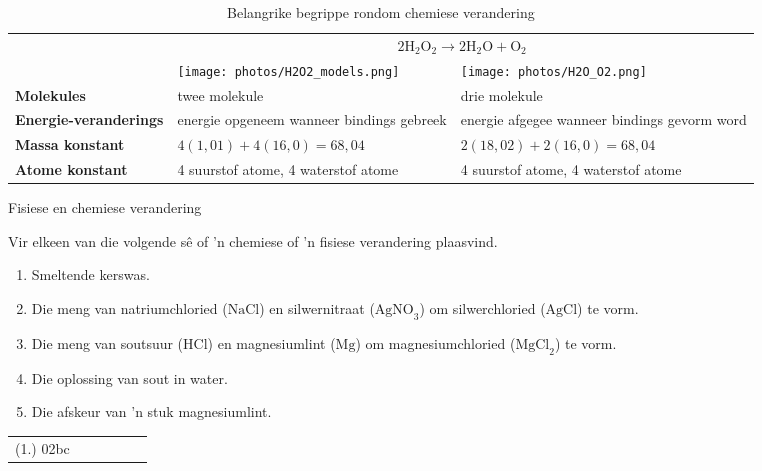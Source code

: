 \begin{table}[H]
 \begin{center}
  \begin{tabular}{|l|p{5cm}|p{5cm}|} \hline
& \multicolumn{2}{|c|}{$2\text{H}_{2}\text{O}_{2} \rightarrow 2\text{H}_{2}\text{O} + \text{O}_{2}$} \\ 
& \texttt{[image: photos/H2O2\_models.png]} & \texttt{[image: photos/H2O\_O2.png]} \\ \hline
   \textbf{Molekules} & twee molekule & drie molekule \\ \hline
\textbf{Energie-veranderings} & energie opgeneem wanneer bindings gebreek & energie afgegee wanneer bindings gevorm word \\ \hline
\textbf{Massa konstant} & $4(1,01) + 4(16,0) = 68,04$ & $2(18,02) + 2(16,0) = 68,04$ \\ \hline
\textbf{Atome konstant} & 4 suurstof atome, 4 waterstof atome & 4 suurstof atome, 4 waterstof atome \\ \hline
  \end{tabular}
 \end{center}
\caption{Belangrike begrippe rondom chemiese verandering}
\label{tab:chemchangeconcepts}
\end{table}
\begin{exercises}{Fisiese en chemiese verandering}
{
Vir elkeen van die volgende s\^{e} of 'n chemiese of 'n fisiese verandering plaasvind.
\begin{enumerate}[noitemsep, label=\textbf{\arabic*}. ]
\item Smeltende kerswas.
\item Die meng van natriumchloried ($\text{NaCl}$) en silwernitraat ($\text{AgNO}_3$) om silwerchloried ($\text{AgCl}$) te vorm.
\item Die meng van soutsuur ($\text{HCl}$) en magnesiumlint ($\text{Mg}$) om magnesiumchloried ($\text{MgCl}_{2}$) te vorm.
\item Die oplossing van sout in water.
\item Die afskeur van 'n stuk magnesiumlint. 
\end{enumerate}

\par \practiceinfo
\par \begin{tabular}[h]{cccccc}
(1.)	02bc	&
\end{tabular}
}
\end{exercises}

